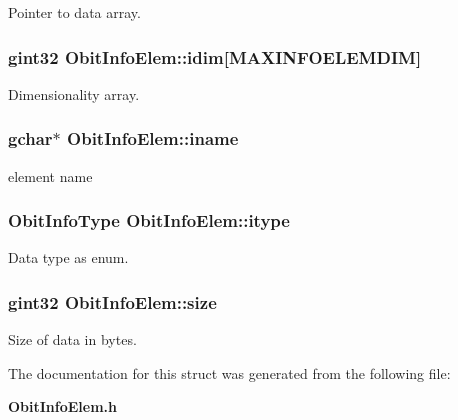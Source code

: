 Pointer to data array. 

\subsubsection{\setlength{\rightskip}{0pt plus 5cm}gint32 {\bf Obit\-Info\-Elem::idim}[MAXINFOELEMDIM]}\label{structObitInfoElem_o2}


Dimensionality array. 

\subsubsection{\setlength{\rightskip}{0pt plus 5cm}gchar$\ast$ {\bf Obit\-Info\-Elem::iname}}\label{structObitInfoElem_o0}


element name 

\subsubsection{\setlength{\rightskip}{0pt plus 5cm}Obit\-Info\-Type {\bf Obit\-Info\-Elem::itype}}\label{structObitInfoElem_o1}


Data type as enum. 

\subsubsection{\setlength{\rightskip}{0pt plus 5cm}gint32 {\bf Obit\-Info\-Elem::size}}\label{structObitInfoElem_o3}


Size of data in bytes. 



The documentation for this struct was generated from the following file:\begin{CompactItemize}
\item 
{\bf Obit\-Info\-Elem.h}\end{CompactItemize}
